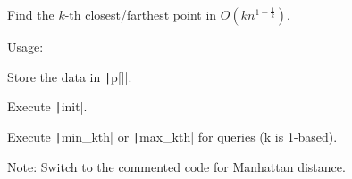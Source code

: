 Find the $k$-th closest/farthest point in $O(kn^{1-\frac{1}{k}})$.

Usage:
\begin{compactenum}
\item Store the data in \texttt|p[]|.
\item Execute \texttt|init|.
\item Execute \texttt|min_kth| or \texttt|max_kth| for queries (k is 1-based).
\end{compactenum}

Note: Switch to the commented code for Manhattan distance.
\inputminted{cpp}{src/data-structure/kd-tree.cpp.com}

